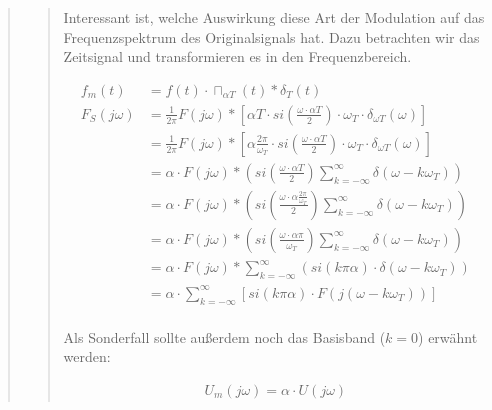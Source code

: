 \begin{quote}
\begin{quote}
        Interessant ist, welche Auswirkung diese Art der Modulation auf das
        Frequenzspektrum des Originalsignals hat.
        Dazu betrachten wir das Zeitsignal und transformieren es in den Frequenzbereich.
        
            \begin{equation*}
                \begin{split}
                    f_m (t)   &= f(t) \cdot \sqcap_{\alpha T} (t) \ast \delta_T (t) \\
                    F_S (j\omega) &= \frac{1}{2\pi} F (j\omega) \ast \left [
                    \alpha T \cdot si \left( \frac{\omega \cdot \alpha T}{2} \right) \cdot \omega_T \cdot \delta_{\omega
                    T} (\omega) \right] \\
                    &= \frac{1}{2\pi} F (j\omega) \ast \left [
                    \alpha \frac{2 \pi}{\omega_T} \cdot si \left( \frac{\omega \cdot \alpha T}{2} \right) \cdot \omega_T
                    \cdot \delta_{\omega T} (\omega) \right] \\
                    &= \alpha \cdot F (j \omega) \ast \left ( si \left( \frac{\omega \cdot \alpha T}{2} \right)
                    \sum_{k=-\infty}^{\infty} \delta (\omega - k\omega_T) \right)\\
                    &= \alpha \cdot F (j \omega) \ast \left ( si \left( \frac{\omega \cdot \alpha \frac{2
                    \pi}{\omega_T}}{2} \right) \sum_{k=-\infty}^{\infty} \delta (\omega - k\omega_T) \right)\\
                    &= \alpha \cdot F (j \omega) \ast \left ( si \left( \frac{\omega \cdot \alpha \pi}{\omega_T}
                    \right) \sum_{k=-\infty}^{\infty} \delta (\omega - k\omega_T) \right)\\
                    &= \alpha \cdot F (j \omega) \ast \sum_{k=-\infty}^{\infty} (si(k \pi \alpha) \cdot \delta (\omega -
                    k\omega_T))\\
                    &= \alpha \cdot \sum_{k=-\infty}^{\infty} \left [ si(k \pi \alpha) \cdot F (j(\omega - k\omega_T))
                    \right]\\
                \end{split}
            \end{equation*}
            
        Als Sonderfall sollte außerdem noch das Basisband ($k = 0$) erwähnt werden:
        
       \begin{equation*}
        	\begin{split}
        		U_m (j\omega) = \alpha \cdot U(j\omega)
        	\end{split}
        \end{equation*}        
        

\end{quote}
\end{quote}
